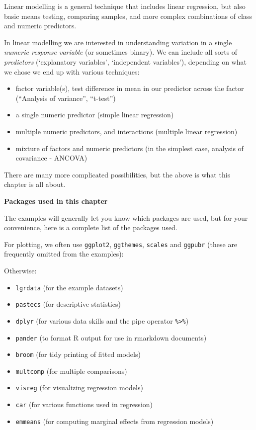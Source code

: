 \documentclass[]{book}
\providecommand{\tightlist}{%
  \setlength{\itemsep}{0pt}\setlength{\parskip}{0pt}}
\begin{document}
Linear modelling is a general technique that includes linear regression, but also basic means testing, comparing samples, and more complex combinations of class and numeric predictors.

In linear modelling we are interested in understanding variation in a single \emph{numeric response variable} (or sometimes binary). We can include all sorts of \emph{predictors} (`explanatory variables', `independent variables'), depending on what we chose we end up with various techniques:

\begin{itemize}
\tightlist
\item
  factor variable(s), test difference in mean in our predictor across the factor (``Analysis of variance'', ``t-test'')
\item
  a single numeric predictor (simple linear regression)
\item
  multiple numeric predictors, and interactions (multiple linear regression)
\item
  mixture of factors and numeric predictors (in the simplest case, analysis of covariance - ANCOVA)
\end{itemize}

There are many more complicated possibilities, but the above is what this chapter is all about.

\textbf{Packages used in this chapter}

The examples will generally let you know which packages are used, but for your convenience, here is a complete list of the packages used.

For plotting, we often use \texttt{ggplot2}, \texttt{ggthemes}, \texttt{scales} and \texttt{ggpubr} (these are frequently omitted from the examples):

Otherwise:

\begin{itemize}
\tightlist
\item
  \texttt{lgrdata} (for the example datasets)
\item
  \texttt{pastecs} (for descriptive statistics)
\item
  \texttt{dplyr} (for various data skills and the pipe operator \texttt{\%\textgreater{}\%})
\item
  \texttt{pander} (to format R output for use in rmarkdown documents)
\item
  \texttt{broom} (for tidy printing of fitted models)
\item
  \texttt{multcomp} (for multiple comparisons)
\item
  \texttt{visreg} (for visualizing regression models)
\item
  \texttt{car} (for various functions used in regression)
\item
  \texttt{emmeans} (for computing marginal effects from regression models)
\end{itemize}
\end{document}
